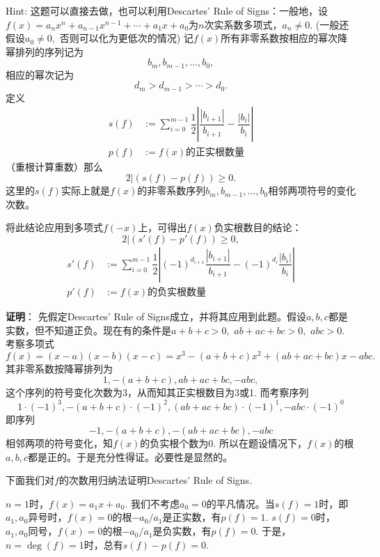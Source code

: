 \vspace{0.5em}

Hint: 这题可以直接去做，也可以利用Descartes' Rule of Signs：一般地，设$f(x) = a_n x^n + a_{n-1} x^{n-1} + \cdots + a_1 x + a_0$为$n$次实系数多项式，$a_n \neq 0.$ (一般还假设$a_0 \neq 0,$ 否则可以化为更低次的情况) 记$f(x)$所有非零系数按相应的幂次降幂排列的序列记为
$$b_m, b_{m-1}, \ldots, b_0,$$
相应的幂次记为
$$d_m > d_{m-1} > \cdots > d_0.$$
定义
\begin{align*}
s(f) & := \sum\limits_{i=0}^{m-1} \dfrac{1}{2} \left\lvert \dfrac{|b_{i+1}|}{b_{i+1}} - \dfrac{|b_{i}|}{b_{i}} \right\rvert \\
p(f) & := \text{$f(x)$的正实根数量}
\end{align*}
（重根计算重数）那么
$$2 | (s(f) - p(f)) \geqslant 0.$$
这里的$s(f)$实际上就是$f(x)$的非零系数序列$b_m, b_{m-1}, \ldots, b_0$相邻两项符号的变化次数。

将此结论应用到多项式$f(-x)$上，可得出$f(x)$负实根数目的结论：
$$2 | (s'(f) - p'(f)) \geqslant 0,$$
\begin{align*}
s'(f) & := \sum\limits_{i=0}^{m-1} \dfrac{1}{2} \left\lvert (-1)^{d_{i+1}}\dfrac{|b_{i+1}|}{b_{i+1}} - (-1)^{d_{i}}\dfrac{|b_{i}|}{b_{i}} \right\rvert \\
p'(f) & := \text{$f(x)$的负实根数量}
\end{align*}

\ifIncludeAnswer

\newpageorvspace

{\bf 证明}： 先假定Descartes' Rule of Signs成立，并将其应用到此题。假设$a, b, c$都是实数，但不知道正负。现在有的条件是$a + b + c > 0,$ $ab + ac + bc > 0,$ $abc > 0.$ 考察多项式
$$f(x) = (x-a)(x-b)(x-c) = x^3 - (a+b+c)x^2 + (ab+ac+bc)x -abc.$$
其非零系数按降幂排列为
$$1, - (a+b+c), ab+ac+bc, -abc,$$
这个序列的符号变化次数为3，从而知其正实根数目为3或1. 而考察序列
$$1\cdot(-1)^3, - (a+b+c)\cdot(-1)^2, (ab+ac+bc)\cdot(-1)^1, -abc\cdot(-1)^0$$
即序列
$$-1, - (a+b+c), -(ab+ac+bc), -abc$$
相邻两项的符号变化，知$f(x)$的负实根个数为0. 所以在题设情况下，$f(x)$的根$a, b, c$都是正的。于是充分性得证。必要性是显然的。

\vspace{0.5em}

下面我们对$f$的次数用归纳法证明Descartes' Rule of Signs.

$n = 1$时，$f(x) = a_1 x + a_0.$ 我们不考虑$a_0 = 0$的平凡情况。当$s(f) = 1$时，即$a_1, a_0$异号时，$f(x) = 0$的根$-a_0 / a_1$是正实数，有$p(f) = 1.$ $s(f) = 0$时，$a_1, a_0$同号，$f(x) = 0$的根$-a_0 / a_1$是负实数，有$p(f) = 0.$ 于是，$n = \deg(f) = 1$时，总有$s(f) - p(f) = 0.$

